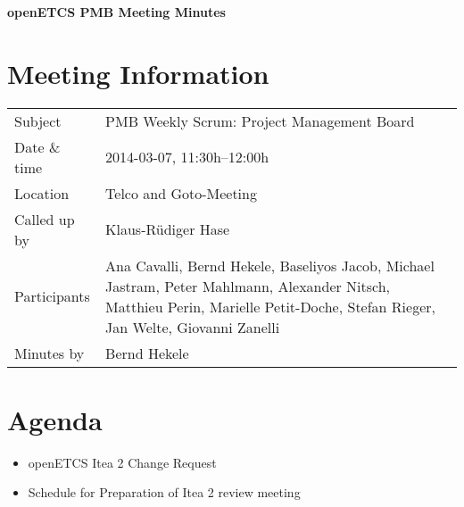 \documentclass[a4paper, 11pt]{article}
\begin{document}
{\begin{center}\huge\bf openETCS PMB Meeting Minutes\end{center}}
\section{Meeting Information}

\renewcommand{\arraystretch}{1.5}
\begin{supertabular}{m{.2\textwidth}m{.8\textwidth}}
Subject & PMB Weekly Scrum: Project Management Board\\
Date \& time & 2014-03-07, 11:30h--12:00h\\
Location & Telco and Goto-Meeting\\
Called up by & Klaus-R\"udiger Hase\\
Participants &
Ana Cavalli,
Bernd Hekele,
Baseliyos Jacob,
Michael Jastram,
Peter Mahlmann,
Alexander Nitsch,
Matthieu Perin,
Marielle Petit-Doche,
Stefan Rieger,
Jan Welte,
Giovanni Zanelli
\\

Minutes by & Bernd Hekele\\

\end{supertabular}
\renewcommand{\arraystretch}{1.0}


\section{{Agenda}}

\begin{itemize}
\item openETCS Itea 2 Change Request
\item Schedule for Preparation of Itea 2 review meeting
\end{itemize}
\end{document}
